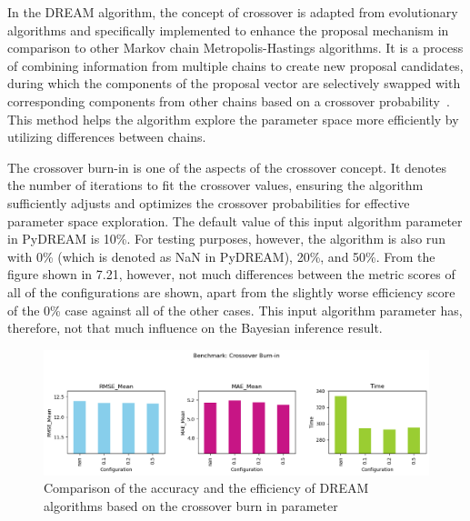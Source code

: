 In the DREAM algorithm, the concept of crossover is adapted from evolutionary algorithms and specifically implemented to enhance the proposal mechanism in comparison to other Markov chain Metropolis-Hastings algorithms. It is a process of combining information from multiple chains to create new proposal candidates, during which the components of the proposal vector are selectively swapped with corresponding components from other chains based on a crossover probability~\cite{dream}. This method helps the algorithm explore the parameter space more efficiently by utilizing differences between chains.

The crossover burn-in is one of the aspects of the crossover concept. It denotes the number of iterations to fit the crossover values, ensuring the algorithm sufficiently adjusts and optimizes the crossover probabilities for effective parameter space exploration. The default value of this input algorithm parameter in PyDREAM is 10\%. For testing purposes, however, the algorithm is also run with 0\% (which is denoted as NaN in PyDREAM), 20\%, and 50\%. From the figure shown in 7.21, however, not much differences between the metric scores of all of the configurations are shown, apart from the slightly worse efficiency score of the 0\% case against all of the other cases. This input algorithm parameter has, therefore, not that much influence on the Bayesian inference result.
\begin{figure}[H]
    \centering
    \includegraphics[width=1\textwidth]{figures/dream/crossover_burn_in.png}
    \captionsetup{width=.8\textwidth}
    \caption{Comparison of the accuracy and the efficiency of DREAM algorithms based on the crossover burn in parameter}
    \label{fig:enter-label}
\end{figure}

